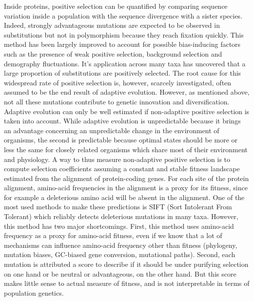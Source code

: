 \documentclass{article}
\begin{document}
    Inside proteins, positive selection can be quantified by comparing sequence variation inside a population with the sequence divergence with a sister species\cite{mcdonald_adaptative_1991}.
    Indeed, strongly advantageous mutations are expected to be observed in substitutions but not in polymorphism because they reach fixation quickly.
    This method has been largely improved to account for possible bias-inducing factors such as the presence of weak positive selection, background selection and demography fluctuations\cite{eyre-walker_distribution_2006, eyre-walker_estimating_2009, galtier_adaptive_2016, tataru_inference_2017}.
    It's application across many taxa has uncovered that a large proportion of substitutions are positively selected\cite{moutinho_variation_2019}.
    The root cause for this widespread rate of positive selection is, however, scarcely investigated, often assumed to be the end result of adaptive evolution.
    However, as mentioned above, not all these mutations contribute to genetic innovation and diversification.
    Adaptive evolution can only be well estimated if non-adaptive positive selection is taken into account.
    While adaptive evolution is unpredictable because it brings an advantage concerning an unpredictable change in the environment of organisms, the second is predictable because optimal states should be more or less the same for closely related organisms which share most of their environment and physiology.
    A way to thus measure non-adaptive positive selection is to compute selection coefficients assuming a constant and stable fitness landscape estimated from the alignment of protein-coding genes.
    For each site of the protein alignment, amino-acid frequencies in the alignment is a proxy for its fitness, since for example a deleterious amino acid will be absent in the alignment.
    One of the most used methods to make these predictions is SIFT (Sort Intolerant From Tolerant) which reliably detects deleterious mutations in many taxa\cite{ng_sift_2003, vaser_sift_2016}.
    However, this method has two major shortcomings.
    First, this method uses amino-acid frequency as a proxy for amino-acid fitness, even if we know that a lot of mechanisms can influence amino-acid frequency other than fitness (phylogeny, mutation biases, GC-biased gene conversion, mutational paths).
    Second, each mutation is attributed a score to describe if it should be under purifying selection on one hand or be neutral or advantageous, on the other hand.
    But this score makes little sense to actual measure of fitness, and is not interpretable in terms of population genetics.
\end{document}

